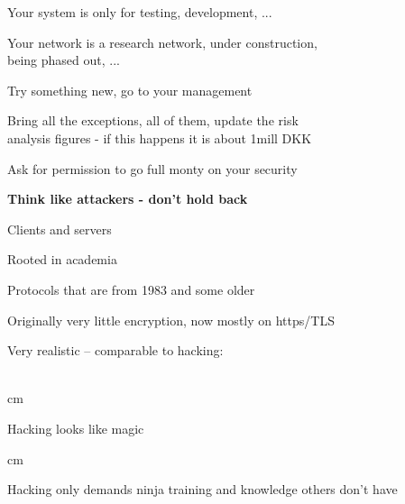 \documentclass[Screen16to9,17pt]{foils}
\begin{document}

Your system is only for testing, development, ...

Your network is a research network, under construction, \\
being phased out, ...

Try something new, go to your management

Bring all the exceptions, all of them, update the risk \\
analysis figures - if this happens it is about 1mill DKK

Ask for permission to go full monty on your security

{\bf Think like attackers - don't hold back}







\begin{list1}
\item Clients and servers
\item Rooted in academia
\item Protocols that are from 1983 and some older
\item Originally very little encryption, now mostly on https/TLS
\end{list1}


Very realistic -- comparable to hacking:\\
\\





 cm

\centerline{Hacking looks like magic}




 cm
\centerline{Hacking only demands ninja training and knowledge others don't have}

\end{document}
